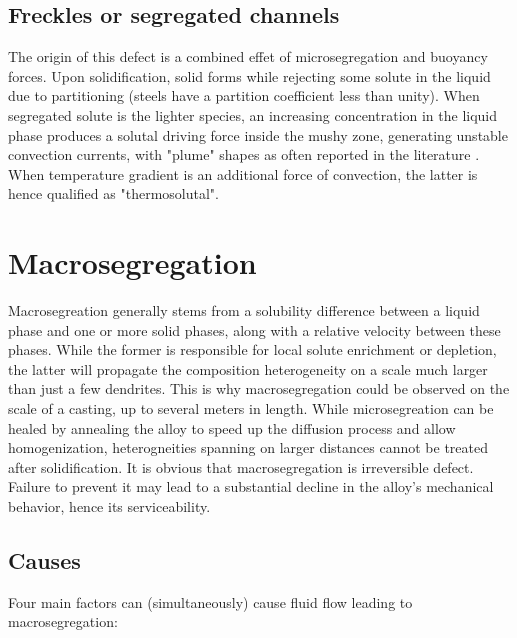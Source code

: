 \subsection*{Freckles or segregated channels} 
The origin of this defect is a combined effet of microsegregation and buoyancy forces. 
Upon solidification, solid forms while rejecting some solute in the liquid due to partitioning (steels have a partition coefficient less than unity).
When segregated solute is the lighter species, an increasing concentration in the liquid phase produces a solutal driving force inside the mushy zone, generating unstable convection currents, with "plume" shapes as often reported in the literature \citep{sarazin_studies_1992, schneider_modeling_1997, shevchenko_chimney_2013}. When temperature gradient is an additional force of convection, the latter is hence qualified as "thermosolutal".
\section{Macrosegregation}
Macrosegreation generally stems from a solubility difference between a liquid phase and one or more solid phases, along with
a relative velocity between these phases. While the former is responsible for local solute enrichment or depletion, the latter
will propagate the composition heterogeneity on a scale much larger than just a few dendrites.
This is why macrosegregation could be observed on the scale of a casting, up to several meters in length. 
While microsegreation can be healed by annealing the alloy to speed up the diffusion process and allow homogenization, heterogneities 
spanning on larger distances cannot be treated after solidification. It is obvious that macrosegregation is irreversible defect. 
Failure to prevent it may lead to a substantial decline in the alloy's mechanical behavior, hence its serviceability.
\subsection{Causes}
Four main factors can (simultaneously) cause fluid flow leading to macrosegregation:
